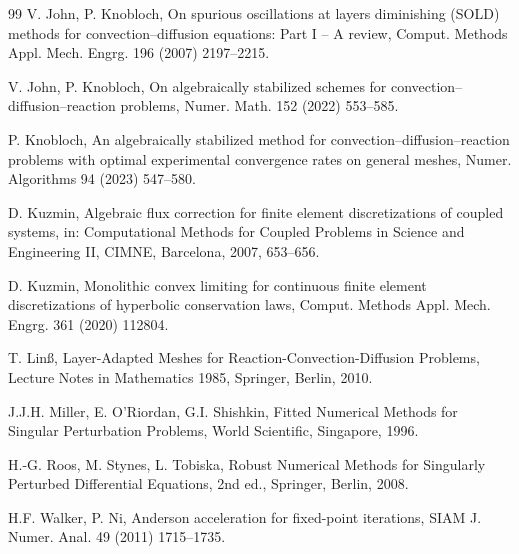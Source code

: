 \documentclass[11pt,a4paper]{article}
\theoremstyle{remark}
\begin{document}
\begin{thebibliography}{99}
 V. John, P. Knobloch, On spurious oscillations at layers diminishing (SOLD) methods for
convection--diffusion equations: Part I -- A review, Comput. Methods Appl. Mech. Engrg. 196 (2007) 2197--2215.

 V. John, P. Knobloch, On algebraically stabilized schemes for convection--diffusion--reaction problems,
Numer. Math. 152 (2022) 553--585.

 P. Knobloch, An algebraically stabilized method for convection--diffusion--reaction problems with
optimal experimental convergence rates on general meshes, Numer. Algorithms 94 (2023) 547--580.

 D. Kuzmin, Algebraic flux correction for finite element discretizations of coupled systems, in:
Computational Methods for Coupled Problems in Science and Engineering II, CIMNE, Barcelona, 2007, 653--656.

 D. Kuzmin, Monolithic convex limiting for continuous finite element discretizations of hyperbolic
conservation laws, Comput. Methods Appl. Mech. Engrg. 361 (2020) 112804.

 T. Lin{\ss}, Layer-Adapted Meshes for Reaction-Convection-Diffusion Problems, Lecture Notes in
Mathematics 1985, Springer, Berlin, 2010.

 J.J.H. Miller, E. O'Riordan, G.I. Shishkin, Fitted Numerical Methods for Singular Perturbation
Problems, World Scientific, Singapore, 1996.

 H.-G. Roos, M. Stynes, L. Tobiska, Robust Numerical Methods for Singularly Perturbed Differential
Equations, 2nd ed., Springer, Berlin, 2008.

 H.F. Walker, P. Ni, Anderson acceleration for fixed-point iterations, SIAM J. Numer. Anal. 49 (2011)
1715--1735.

\end{thebibliography}
\end{document}
